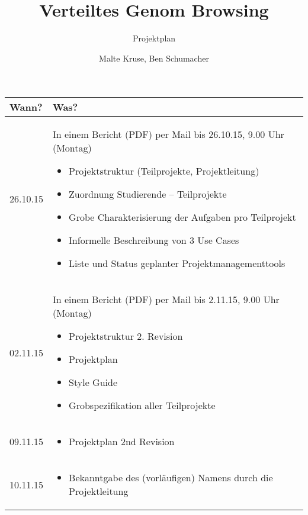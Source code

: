 \documentclass{scrartcl}
\title{Verteiltes Genom Browsing}
\subtitle{Projektplan}
\author{Malte Kruse, Ben Schumacher}
\begin{document}
\pagestyle{fancy}
\cfoot{}
\rfoot{\pagemark}
\maketitle
\thispagestyle{empty}
\newpage

\begin{longtable}{| l | p{14cm} |}
\hline
\textbf{Wann?} & \textbf{Was?} \\
\hline
26.10.15 & In einem Bericht (PDF) per Mail bis 26.10.15, 9.00 Uhr (Montag)
\begin{itemize}
  \item Projektstruktur (Teilprojekte, Projektleitung)
  \item Zuordnung Studierende – Teilprojekte
  \item Grobe Charakterisierung der Aufgaben pro Teilprojekt
  \item Informelle Beschreibung von 3 Use Cases
  \item Liste und Status geplanter Projektmanagementtools 
\end{itemize}\\
 \hline
02.11.15 & In einem Bericht (PDF) per Mail bis 2.11.15, 9.00 Uhr (Montag)
\begin{itemize}
  \item Projektstruktur 2. Revision
  \item Projektplan
  \item Style Guide
  \item Grobspezifikation aller Teilprojekte
\end{itemize}\\
\hline
09.11.15 & \begin{itemize}
 \item Projektplan 2nd Revision
\end{itemize}\\
\hline
10.11.15 & \begin{itemize}
 \item Bekanntgabe des (vorläufigen) Namens durch die Projektleitung

\end{itemize}
\end{longtable}
\end{document}

